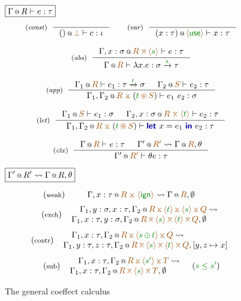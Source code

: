 \begin{figure}[t]
$\boxed{
\coctx{\Gamma}{R} \vdash e : \tau
}$
\[
\begin{array}{c}
\tyrule{const}{\;}
  { \coctx{ () }{ \azero } \vdash c : \iota }
\quad\quad
\tyrule{var}{\;}
  { \coctx{ (x:\tau) }{ \aunit } \vdash x : \tau }
\\[1.8em]
\tyrule{abs}
  { \coctx{\Gamma, x : \sigma}{\aclrd{R}\; \amerge \, \alift{\cclrd{s}}} \vdash e : \tau }
  { \coctx{\Gamma}{\aclrd{R}} \vdash \lambda x . e : \sigma \xrightarrow{\cclrd{s}} \tau }
\\[1.8em]
\tyrule{app}
  { \coctx{\Gamma_1}{\aclrd{R}} \vdash e_1 : \tau \xrightarrow{\cclrd{t}} \sigma &
    \coctx{\Gamma_2}{\aclrd{S}} \vdash e_2 : \tau }
  {\coctx{\Gamma_1, \Gamma_2}{ \aclrd{R} \;\asplit\; (\cclrd{t} \,\aseq\, \aclrd{S}) } \vdash e_1~e_2 : \sigma } 
\\[1.8em]
\tyrule{let}
  { \coctx{\Gamma_1}{\aclrd{S}} \vdash e_1 : \sigma & 
    \coctx{\Gamma_2, x:\sigma}{\aclrd{R}\; \amerge\; \alift{\cclrd{t}}} \vdash e_2 : \tau  }
  { \coctx{\Gamma_1, \Gamma_2}{\aclrd{R}\; \asplit\; (\cclrd{t} \,\aseq\, \aclrd{S}) } \vdash \kvd{let}~x=e_1~\kvd{in}~e_2 : \tau }
\\[1.8em]
\tyrule{ctx}
  { \coctx{\Gamma}{\aclrd{R}} \vdash e : \tau & \ctxtrans{ \coctx{\Gamma}{\aclrd{R}} }{ \coctx{\Gamma'}{\aclrd{R'}} }{\theta}}
  { \coctx{\Gamma'}{\aclrd{R'}} \vdash \theta e : \tau }
\end{array}
\]

$\boxed{
\ctxtrans{ \coctx{\Gamma}{R} }{ \coctx{\Gamma'}{R'} }{\theta}
}$

\[
\tystmt{weak}
  { \quad\quad 
    \ctxtrans{ \coctx{\Gamma}{\aclrd{R}} }{ \coctx{\Gamma, x:\tau}{\aclrd{R}\; \asplit\; \aweak } }{\emptyset}
    \quad\quad\quad }
\]
\[ 
\tystmt{exch}
  { \ctxtransnl{ \coctx{\Gamma_1, x:\tau, y:\sigma, \Gamma_2}{\aclrd{R} \,\amerge\, \alift{\cclrd{s}} \,\amerge\, \alift{\cclrd{t}} \,\amerge\, \aclrd{Q}} }
               { \quad \coctx{\Gamma_1, y:\sigma, x:\tau, \Gamma_2}{\aclrd{R} \,\asplit\, \alift{\cclrd{t}} \,\asplit\, \alift{\cclrd{s}} \,\asplit\, \aclrd{Q}} }{\emptyset} }
\]
\[
\tystmt{contr}
  { \ctxtransnl{ \coctx{\Gamma_1, y:\tau, z:\tau, \Gamma_2}{\aclrd{R} \,\amerge\, \alift{\cclrd{s}} \,\amerge\, \alift{\cclrd{t}} \,\amerge\, \aclrd{Q} } }
               { \quad \coctx{\Gamma_1, x:\tau, \Gamma_2}{\aclrd{R}\, \asplit\, \alift{\cclrd{s}\, \cpar\, \cclrd{t}} \,\asplit\, \aclrd{Q}} }{[y,z \mapsto x]}}
\]
\[
\tystmt{sub}
  { \ctxtransnl{ \coctx{\Gamma_1, x:\tau,\Gamma_2}{\aclrd{R} \,\amerge\, \alift{\cclrd{s}} \,\amerge\, \aclrd{T} } }
               { \quad \coctx{\Gamma_1, x:\tau, \Gamma_2}{\aclrd{R}\, \asplit\, \alift{\cclrd{s'}} \,\asplit\, \aclrd{T}} }{\emptyset} }
\quad(\cclrd{s} \;\cleq\; \cclrd{s'} )                 
\]
\caption{The general coeffect calculus}
\vspace{-1em}
\label{fig:unified-coeffects}
\end{figure}

